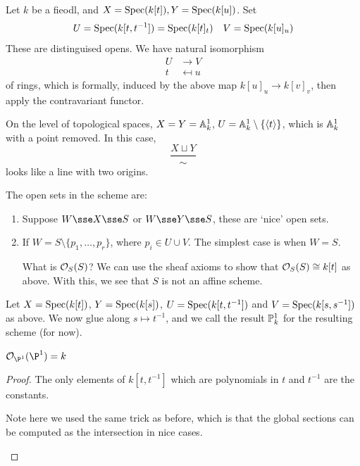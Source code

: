 \documentclass{article}
\begin{document}
\begin{example}
    \label{ex:bug-eyed-line}
    Let \(k\) be a fieodl, and \(X = \operatorname{Spec}(k[t]), Y = \operatorname{Spec}(k[u])\). Set
    \[U = \operatorname{Spec}(k[t, t^{-1}]) = \operatorname{Spec}(k[t]_t) \quad V = \operatorname{Spec}(k[u]_u)\]
    These are distinguised opens. We have natural isomorphism
    \begin{align*}
        U &\to V \\
        t &\mapsfrom u
    \end{align*}
    of rings, which is formally, induced by the above map \(k[u]_u \to k[v]_v\), then apply the contravariant functor.

    On the level of topological spaces, \(X = Y = \mathbb{A}_{k}^{1}\), \(U = \mathbb{A}_{k}^{1} \setminus \{\left\langle t \right\rangle\}\), which is \(\mathbb{A}_{k}^{1}\) with a point removed. In this case,
    \[\frac{X \sqcup Y}{\sim}\]
    looks like a line with two origins.

    The open sets in the scheme are:

    \begin{enumerate}
        \item Suppose \(W \sse X \sse S\) or \(W \sse Y \sse S\), these are `nice' open sets. 
        \item If \(W = S \setminus \{p_1, \dots, p_r\}\), where \(p_i \in U \cup V\). The simplest case is when \(W = S\).
        
        What is \(\mathcal{O}_S(S)\)? We can use the sheaf axioms to show that \(\mathcal{O}_S(S) \cong k[t]\) as above. With this, we see that \(S\) is not an affine scheme.
    \end{enumerate}
\end{example}

\begin{example}
    Let \(X = \operatorname{Spec}(k[t])\), \(Y = \operatorname{Spec}(k[s])\), \(U = \operatorname{Spec}(k[t, t^{-1}])\) and \(V = \operatorname{Spec}(k[s, s^{-1}])\) as above. We now glue along \(s \mapsto t^{-1}\), and we call the result \(\mathbb{P}^1_k\) for the resulting scheme (for now).
\end{example}

\begin{proposition}
    \(\mcO_{\P^1}(\P^1) = k\)
\end{proposition}

\begin{proof}
    The only elements of \(k[t, t^{-1}]\) which are polynomials in \(t\) and \(t^{-1}\) are the constants. \begin{addendum}
        Note here we used the same trick as before, which is that the global sections can be computed as the intersection in nice cases.
    \end{addendum}
\end{proof}
\end{document}
